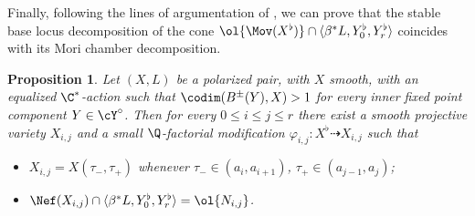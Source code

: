 \documentclass[reqno]{amsproc}
\newtheorem{proposition}[theorem]{Proposition}
\theoremstyle{definition}
\begin{document}
Finally, following the lines of argumentation of \cite[Proposition 4.11]{wors6-WORS3}, we can prove  that the stable base locus decomposition of the cone $\ol{\Mov(X^\flat)}\cap \langle \beta^* L,Y^\flat_0,Y^\flat_r\rangle$  coincides with its Mori chamber decomposition. 

\begin{proposition}\label{wors6:prop:WORS3}
Let $(X,L)$ be a polarized pair, with $X$ smooth,  with an equalized $\C^*$-action such that  $\codim(B^\pm(Y),X)>1$ for every inner fixed point component $Y\in\cY^\circ$.
Then for every $0 \le i \le j \le r$ there exist a smooth projective variety $X_{i,j}$ and a small $\Q$-factorial modification $\varphi_{i,j}:X^{\flat}\dashrightarrow X_{i,j}$ such that
\begin{itemize}
\item $X_{i,j}=X(\tau_-,\tau_+)$ whenever $\tau_-\in(a_i,a_{i+1})$, $\tau_+\in (a_{j-1},a_j)$; 
\item $\Nef(X_{i,j})\cap \langle \beta^* L,Y^\flat_0,Y^\flat_r\rangle=\ol{N_{i,j}}$.
\end{itemize}
\end{proposition} 
\end{document}
